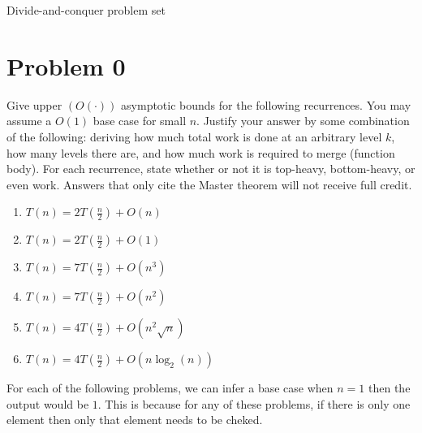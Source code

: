 \documentclass[12pt,letterpaper]{article}
\begin{document}
\begin{center}
    \LARGE Divide-and-conquer problem set
\end{center}

\section*{Problem 0}

Give upper $(O(\cdot))$ asymptotic bounds for the following recurrences. You may assume a $O(1)$
base case for small $n$. Justify your answer by some combination of the following: deriving
how much total work is done at an arbitrary level $k$, how many levels there are, and how
much work is required to merge (function body). For each recurrence, state whether or not
it is top-heavy, bottom-heavy, or even work. Answers that only cite the Master theorem will
not receive full credit.

\begin{enumerate}
    \item{$T(n) = 2T(\frac{n}{2})+O(n)$}
    \item{$T(n) = 2T(\frac{n}{2})+O(1)$}
    \item{$T(n) = 7T(\frac{n}{2})+O(n^3)$}
    \item{$T(n) = 7T(\frac{n}{2})+O(n^2)$}
    \item{$T(n) = 4T(\frac{n}{2})+O(n^2\sqrt{n})$}
    \item{$T(n) = 4T(\frac{n}{2})+O(n\log_2(n))$}
\end{enumerate}

For each of the following problems, we can infer a base case when $n = 1$ then the output would be $1$.
This is because for any of these problems, if there is only one element then only that element needs to be cheked.
\end{document}
